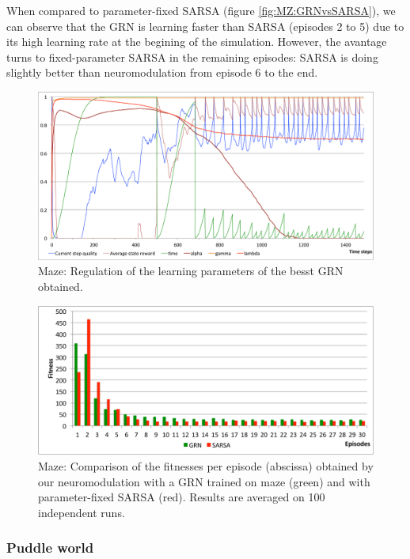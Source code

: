 When compared to parameter-fixed SARSA (figure \ref{fig:MZ:GRNvsSARSA}), we can observe that the GRN is learning faster than SARSA (episodes 2 to 5) due to its high learning rate at the begining of the simulation. However, the avantage turns to fixed-parameter SARSA in the remaining episodes: SARSA is doing slightly better than neuromodulation from episode 6 to the end.

\begin{figure}
\center
\includegraphics[width=\linewidth]{MZ_GRNBehavior.pdf}
\caption{Maze: Regulation of the learning parameters of the besst GRN obtained.}\label{fig:MZ:GRNBehavior}
\end{figure}

\begin{figure}
\center
\includegraphics[width=\linewidth]{MZ_GRNvsSARSA.pdf}
\caption{Maze: Comparison of the fitnesses per episode (abscissa) obtained by our neuromodulation with a GRN trained on maze (green) and with parameter-fixed SARSA (red). Results are averaged on 100 independent runs.}\label{fig:MC:GRNvsSARSA}
\end{figure}


\subsubsection{Puddle world}

